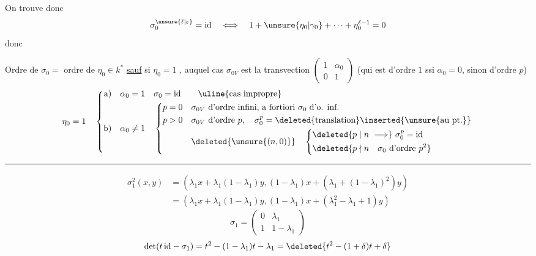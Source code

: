 On trouve donc
\[
\sigma_0^{\unsure{\ell|\varepsilon}}=\mathrm{id}\quad\Longleftrightarrow\quad
1+\unsure{\eta_0|\gamma_0}+\cdots+\eta_0^{\ell-1}=0
\]
donc

Ordre de $\sigma_0=$ ordre de $\eta_0\in k^*$ \uline{sauf} si $\eta_0=1$ , auquel cas $\sigma_{0V}$ est la transvection
$\begin{pmatrix}1&\alpha_0\\0&1\end{pmatrix}$
(qui est d'ordre $1$ ssi $\alpha_0=0$, sinon d'ordre $p$)
\[
\eta_0=1\quad\left\{\begin{aligned}
\text{a)}\quad&\alpha_0=1\quad\sigma_0=\mathrm{id}\qquad\text{\uline{cas impropre}}\\
\text{b)}\quad&\alpha_0\ne1\quad\left\{\begin{aligned}
p=0\quad&\sigma_{0V}\text{ d'ordre infini, a fortiori }\sigma_0\text{ d'o. inf.}\\
p>0\quad&\sigma_{0V}\text{ d'ordre }p,\quad\sigma_0^p=\deleted{\text{translation}}\inserted{\text{\unsure{au pt.}}}\\
&\deleted{\unsure{(n,0)}}\quad\left\{\begin{aligned}
&\deleted{p\mid n\ \Longrightarrow}\ \sigma_0^p=\mathrm{id}\\
&\deleted{p\nmid n\quad\sigma_0\text{ d'ordre }p^2}
\end{aligned}\right.
\end{aligned}\right.
\end{aligned}\right.
\]
\par\noindent\rule{.4\linewidth}{.4pt}\par
\[
\begin{aligned}
\sigma_1^2(x,y)&=(\lambda_1x+\lambda_1(1-\lambda_1)y,(1-\lambda_1)x+(\lambda_1+(1-\lambda_1)^2)y)\\
&=(\lambda_1x+\lambda_1(1-\lambda_1)y,(1-\lambda_1)x+(\lambda_1^2-\lambda_1+1)y)
\end{aligned}
\]
\[
\sigma_1=\begin{pmatrix}0&\lambda_1\\1&1-\lambda_1\end{pmatrix}
\]
\[
\det(t\,\mathrm{id}-\sigma_1)=t^2-(1-\lambda_1)t-\lambda_1
=\deleted{t^2-(1+\delta)t+\delta}
\]

